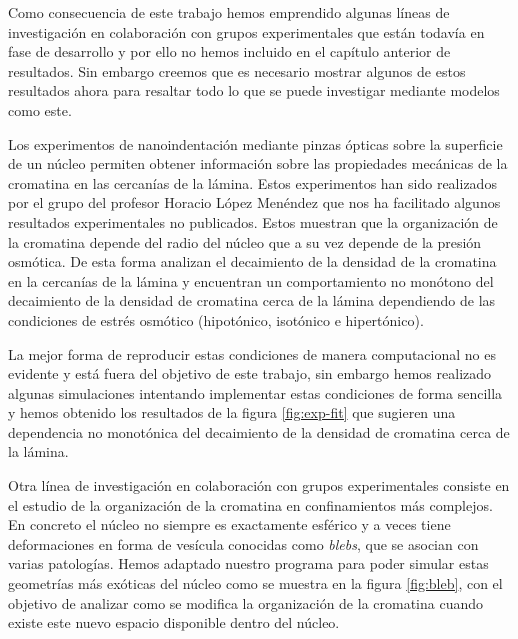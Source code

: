 Como consecuencia de este trabajo hemos emprendido algunas líneas de investigación en colaboración con grupos experimentales que están todavía en fase de desarrollo y por ello no hemos incluido en el capítulo anterior de resultados. Sin embargo creemos que es necesario mostrar algunos de estos resultados ahora para resaltar todo lo que se puede investigar mediante modelos como este.

Los experimentos de nanoindentación mediante pinzas ópticas sobre la superficie de un núcleo permiten obtener información sobre las propiedades mecánicas de la cromatina en las cercanías de la lámina. Estos experimentos han sido realizados por el grupo del profesor Horacio López Menéndez que nos ha facilitado algunos resultados experimentales no publicados. Estos muestran que la organización de la cromatina depende del radio del núcleo que a su vez depende de la presión osmótica. De esta forma analizan el decaimiento de la densidad de la cromatina en la cercanías de la lámina y encuentran un comportamiento no monótono del decaimiento de la densidad de cromatina cerca de la lámina dependiendo de las condiciones de estrés osmótico (hipotónico, isotónico e hipertónico).

La mejor forma de reproducir estas condiciones de manera computacional no es evidente y está fuera del objetivo de este trabajo, sin embargo hemos realizado algunas simulaciones intentando implementar estas condiciones de forma sencilla y hemos obtenido los resultados de la figura \ref{fig:exp-fit} que sugieren una dependencia no monotónica del decaimiento de la densidad de cromatina cerca de la lámina.

Otra línea de investigación en colaboración con grupos experimentales consiste en el estudio de la organización de la cromatina en confinamientos más complejos. En concreto el núcleo no siempre es exactamente esférico y a veces tiene deformaciones en forma de vesícula conocidas como \textit{blebs}, que se asocian con varias patologías. Hemos adaptado nuestro programa para poder simular estas geometrías más exóticas del núcleo como se muestra en la figura \ref{fig:bleb}, con el objetivo de analizar como se modifica la organización de la cromatina cuando existe este nuevo espacio disponible dentro del núcleo.

